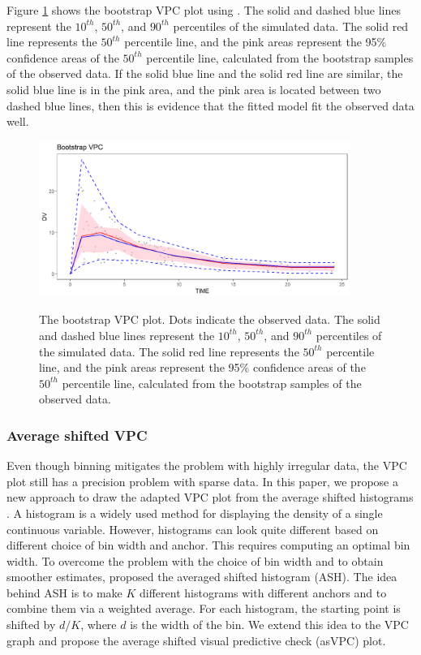 Figure \ref{Fig4} shows the bootstrap VPC plot using .  The solid and dashed blue lines represent the $10^{th}$, $50^{th}$, and $90^{th}$ percentiles of the simulated data. The solid red line represents the $50^{th}$ percentile line, and the pink areas represent the 95\% confidence areas of the $50^{th}$ percentile line, calculated from the bootstrap samples of the observed data. If the solid blue line and the solid red line are similar, the solid blue line is in the pink area, and the pink area is located between two dashed blue lines,
then this is evidence that the fitted model fit the observed data well.


\begin{figure}
\caption{The bootstrap VPC plot. Dots indicate the observed data. The solid and dashed blue lines represent the $10^{th}$, $50^{th}$, and $90^{th}$ percentiles of the simulated data. The solid red line represents the $50^{th}$ percentile line, and the pink areas represent the 95\% confidence areas of the $50^{th}$ percentile line, calculated from the bootstrap samples of the observed data.}
\centering
\includegraphics[width=4in,height=2in]{plotPNG/Fig2-1.png}
\label{Fig4}
\end{figure}


\hypertarget{asVPC}{%
\subsubsection{Average shifted VPC}\label{asVPC}}

Even though binning mitigates the problem with highly irregular data, the VPC plot still has a precision problem with sparse data. In this paper, we propose a new approach to draw the adapted VPC plot from the average shifted histograms \citep{scott1985ash}.
A histogram is a widely used method for displaying the density of a single continuous variable. However, histograms can look quite different based on different choice of bin width and anchor.
This requires computing an optimal bin width.
To overcome the problem with the choice of bin width and to obtain smoother estimates,  \cite{scott1985ash} proposed the averaged shifted histogram (ASH). The idea behind ASH is to make $K$ different histograms with different anchors and to combine them via a weighted average. For each histogram, the starting point is shifted by $d/K$, where $d$ is the width of the bin. We extend this idea to the VPC graph and propose the average shifted visual predictive check (asVPC) plot.

